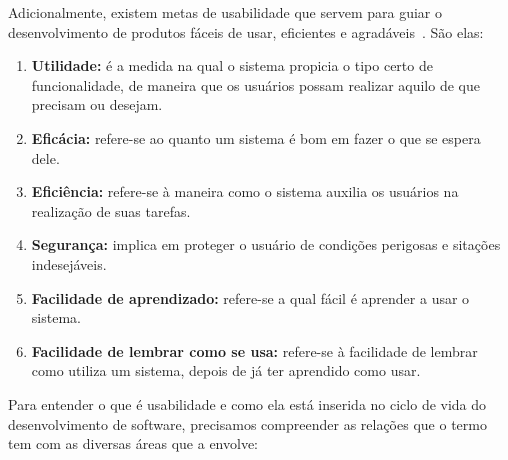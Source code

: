 
Adicionalmente, existem metas de usabilidade que servem para guiar o desenvolvimento de produtos fáceis de usar, eficientes e agradáveis~\cite{preece2007}. São elas:

\begin{enumerate}
	\item \textbf{Utilidade:} é a medida na qual o sistema propicia o tipo certo de funcionalidade, de maneira que os usuários possam realizar aquilo de que precisam ou desejam.
	\item \textbf{Eficácia:} refere-se ao quanto um sistema é bom em fazer o que se espera dele.
	\item \textbf{Eficiência:} refere-se à maneira como o sistema auxilia os usuários na realização de suas tarefas.
	\item \textbf{Segurança:} implica em proteger o usuário de condições perigosas e sitações indesejáveis.
	\item \textbf{Facilidade de aprendizado:} refere-se a qual fácil é aprender a usar o sistema.
	\item \textbf{Facilidade de lembrar como se usa:} refere-se à facilidade de lembrar como utiliza um sistema, depois de já ter aprendido como usar.
\end{enumerate}

Para entender o que é usabilidade e como ela está inserida no ciclo de vida do desenvolvimento de software, precisamos compreender as relações que o termo tem com as diversas áreas que a envolve: 

